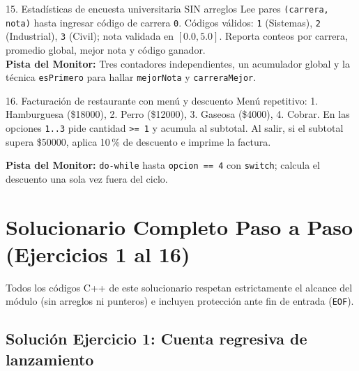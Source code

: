 \documentclass[11pt,letterpaper]{article}
\begin{document}
\begin{ejercicio}{15. Estadísticas de encuesta universitaria SIN arreglos}
Lee pares \texttt{(carrera, nota)} hasta ingresar código de carrera \texttt{0}. Códigos válidos: \texttt{1} (Sistemas), \texttt{2} (Industrial), \texttt{3} (Civil); nota validada en $[0.0, 5.0]$. Reporta conteos por carrera, promedio global, mejor nota y código ganador.\\
\textbf{Pista del Monitor:} Tres contadores independientes, un acumulador global y la técnica \texttt{esPrimero} para hallar \texttt{mejorNota} y \texttt{carreraMejor}.
\end{ejercicio}

\begin{ejercicio}{16. Facturación de restaurante con menú y descuento}
Menú repetitivo: 1. Hamburguesa (\$18000), 2. Perro (\$12000), 3. Gaseosa (\$4000), 4. Cobrar. En las opciones \texttt{1..3} pide cantidad \texttt{>= 1} y acumula al subtotal. Al salir, si el subtotal supera \$50000, aplica 10\,\% de descuento e imprime la factura.\par\smallskip
\textbf{Pista del Monitor:} \texttt{do-while} hasta \texttt{opcion == 4} con \texttt{switch}; calcula el descuento una sola vez fuera del ciclo.
\end{ejercicio}

\section{Solucionario Completo Paso a Paso (Ejercicios 1 al 16)}

Todos los códigos C++ de este solucionario respetan estrictamente el alcance del módulo (sin arreglos ni punteros) e incluyen protección ante fin de entrada (\texttt{EOF}).

\subsection{Solución Ejercicio 1: Cuenta regresiva de lanzamiento}
\end{document}
